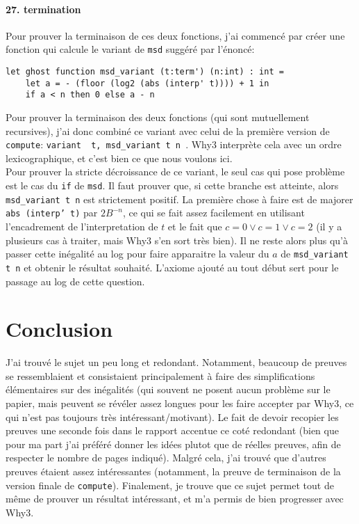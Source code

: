 \documentclass[a4paper]{article}%
\begin{document}
	\paragraph{27. termination} Pour prouver la terminaison de ces deux fonctions, j'ai commencé par créer une fonction qui calcule
	le variant de \texttt{msd} suggéré par l'énoncé:
	\begin{verbatim}
let ghost function msd_variant (t:term') (n:int) : int =
	let a = - (floor (log2 (abs (interp' t)))) + 1 in
	if a < n then 0 else a - n
	\end{verbatim}
	Pour prouver la terminaison des deux fonctions (qui sont mutuellement recursives),
	j'ai donc combiné ce variant avec celui de la première version de \texttt{compute}:
	\texttt{variant { t, msd_variant t n }}.
	Why3 interprète cela avec un ordre lexicographique, et c'est bien ce que nous voulons ici.\\

	Pour prouver la stricte décroissance de ce variant, le seul cas qui pose problème est le cas du \texttt{if}
	de \texttt{msd}. Il faut prouver que, si cette branche est atteinte, alors \texttt{msd_variant t n}
	est strictement positif. La première chose à faire est de majorer \texttt{abs (interp' t)} par $2B^{-n}$,
	ce qui se fait assez facilement en utilisant l'encadrement de l'interpretation de $t$ et le fait que $c=0 \vee c=1 \vee c=2$
	(il y a plusieurs cas à traiter, mais Why3 s'en sort très bien). Il ne reste alors plus qu'à passer cette inégalité au log
	pour faire apparaitre la valeur du $a$ de \texttt{msd_variant t n} et obtenir le résultat souhaité.
	L'axiome ajouté au tout début sert pour le passage au log de cette question.

	\section{Conclusion}

	J'ai trouvé le sujet un peu long et redondant. Notamment, beaucoup de preuves se ressemblaient et consistaient principalement
	à faire des simplifications élémentaires sur des inégalités (qui souvent ne posent aucun problème sur le papier,
	mais peuvent se révéler assez longues pour les faire accepter par Why3, ce qui n'est pas toujours très intéressant/motivant).
	Le fait de devoir recopier les preuves une seconde fois dans le rapport accentue ce coté redondant (bien que pour ma part
	j'ai préféré donner les idées plutot que de réelles preuves, afin de respecter le nombre de pages indiqué).
	Malgré cela, j'ai trouvé que d'autres preuves étaient assez intéressantes
	(notamment, la preuve de terminaison de la version finale de \texttt{compute}).
	Finalement, je trouve que ce sujet permet tout de même de prouver un résultat intéressant,
	et m'a permis de bien progresser avec Why3.\\
	
\end{document}

